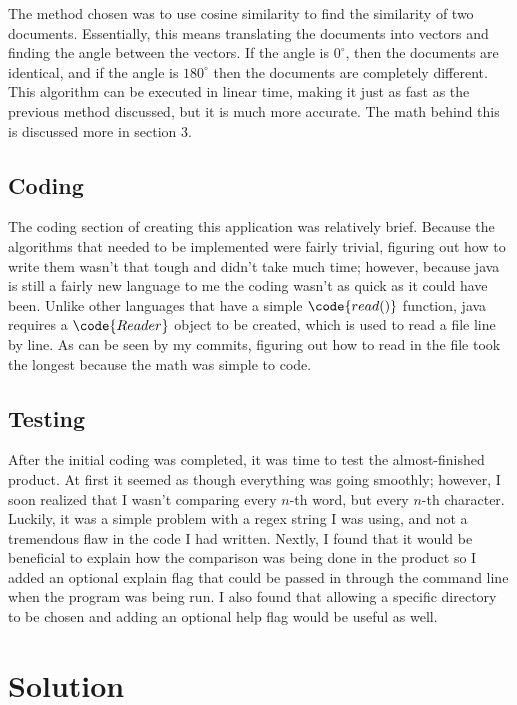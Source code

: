 \documentclass[11pt]{article} %
\begin{document}
The method chosen was to use cosine similarity to find the similarity of two documents. Essentially, this means translating the documents into vectors and finding the angle between the vectors. If the angle is $0^{\circ}$, then the documents are identical, and if the angle is $180^{\circ}$ then the documents are completely different. This algorithm can be executed in linear time, making it just as fast as the previous method discussed, but it is much more accurate. The math behind this is discussed more in section 3.

\subsection{Coding}

The coding section of creating this application was relatively brief. Because the algorithms that needed to be implemented were fairly trivial, figuring out how to write them wasn't that tough and didn't take much time; however, because java is still a fairly new language to me the coding wasn't as quick as it could have been. Unlike other languages that have a simple $\code{read()}$ function, java requires a $\code{Reader}$ object to be created, which is used to read a file line by line. As can be seen by my commits, figuring out how to read in the file took the longest because the math was simple to code.

\subsection{Testing}

After the initial coding was completed, it was time to test the almost-finished product. At first it seemed as though everything was going smoothly; however, I soon realized that I wasn't comparing every $n$-th word, but every $n$-th character. Luckily, it was a simple problem with a regex string I was using, and not a tremendous flaw in the code I had written. Nextly, I found that it would be beneficial to explain how the comparison was being done in the product so I added an optional explain flag that could be passed in through the command line when the program was being run. I also found that allowing a specific directory to be chosen and adding an optional help flag would be useful as well.
	


\section{Solution}
\end{document}
